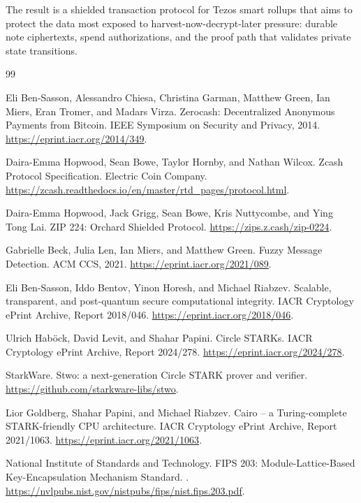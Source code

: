 \documentclass[11pt]{article}
\begin{document}
The result is a shielded transaction protocol for Tezos smart rollups that aims
to protect the data most exposed to harvest-now-decrypt-later pressure: durable
note ciphertexts, spend authorizations, and the proof path that validates
private state transitions.

\begin{thebibliography}{99}

Eli Ben-Sasson, Alessandro Chiesa, Christina Garman, Matthew Green, Ian Miers,
Eran Tromer, and Madars Virza.
\newblock Zerocash: Decentralized Anonymous Payments from Bitcoin.
\newblock IEEE Symposium on Security and Privacy, 2014.
\newblock \url{https://eprint.iacr.org/2014/349}.

Daira-Emma Hopwood, Sean Bowe, Taylor Hornby, and Nathan Wilcox.
\newblock Zcash Protocol Specification.
\newblock Electric Coin Company.
\newblock \url{https://zcash.readthedocs.io/en/master/rtd_pages/protocol.html}.

Daira-Emma Hopwood, Jack Grigg, Sean Bowe, Kris Nuttycombe, and Ying Tong Lai.
\newblock ZIP 224: Orchard Shielded Protocol.
\newblock \url{https://zips.z.cash/zip-0224}.

Gabrielle Beck, Julia Len, Ian Miers, and Matthew Green.
\newblock Fuzzy Message Detection.
\newblock ACM CCS, 2021.
\newblock \url{https://eprint.iacr.org/2021/089}.

Eli Ben-Sasson, Iddo Bentov, Yinon Horesh, and Michael Riabzev.
\newblock Scalable, transparent, and post-quantum secure computational
integrity.
\newblock IACR Cryptology ePrint Archive, Report 2018/046.
\newblock \url{https://eprint.iacr.org/2018/046}.

Ulrich Hab\"ock, David Levit, and Shahar Papini.
\newblock Circle STARKs.
\newblock IACR Cryptology ePrint Archive, Report 2024/278.
\newblock \url{https://eprint.iacr.org/2024/278}.

StarkWare.
\newblock Stwo: a next-generation Circle STARK prover and verifier.
\newblock \url{https://github.com/starkware-libs/stwo}.

Lior Goldberg, Shahar Papini, and Michael Riabzev.
\newblock Cairo -- a Turing-complete STARK-friendly CPU architecture.
\newblock IACR Cryptology ePrint Archive, Report 2021/1063.
\newblock \url{https://eprint.iacr.org/2021/1063}.

National Institute of Standards and Technology.
\newblock FIPS 203: Module-Lattice-Based Key-Encapsulation Mechanism Standard.
.
\newblock \url{https://nvlpubs.nist.gov/nistpubs/fips/nist.fips.203.pdf}.


\end{thebibliography}
\end{document}
